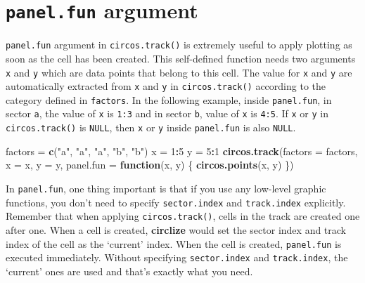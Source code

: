 \documentclass[]{book}
\newenvironment{Shaded}{\begin{snugshade}}{\end{snugshade}}
\newcommand{\KeywordTok}[1]{\textcolor[rgb]{0.13,0.29,0.53}{\textbf{#1}}}
\newcommand{\DataTypeTok}[1]{\textcolor[rgb]{0.13,0.29,0.53}{#1}}
\newcommand{\DecValTok}[1]{\textcolor[rgb]{0.00,0.00,0.81}{#1}}
\newcommand{\StringTok}[1]{\textcolor[rgb]{0.31,0.60,0.02}{#1}}
\newcommand{\ControlFlowTok}[1]{\textcolor[rgb]{0.13,0.29,0.53}{\textbf{#1}}}
\newcommand{\OperatorTok}[1]{\textcolor[rgb]{0.81,0.36,0.00}{\textbf{#1}}}
\newcommand{\NormalTok}[1]{#1}
\begin{document}
\section{\texorpdfstring{\texttt{panel.fun}
argument}{panel.fun argument}}\label{panel-fun}

\texttt{panel.fun} argument in \texttt{circos.track()} is extremely
useful to apply plotting as soon as the cell has been created. This
self-defined function needs two arguments \texttt{x} and \texttt{y}
which are data points that belong to this cell. The value for \texttt{x}
and \texttt{y} are automatically extracted from \texttt{x} and
\texttt{y} in \texttt{circos.track()} according to the category defined
in \texttt{factors}. In the following example, inside
\texttt{panel.fun}, in sector \texttt{a}, the value of \texttt{x} is
\texttt{1:3} and in sector \texttt{b}, value of \texttt{x} is
\texttt{4:5}. If \texttt{x} or \texttt{y} in \texttt{circos.track()} is
\texttt{NULL}, then \texttt{x} or \texttt{y} inside \texttt{panel.fun}
is also \texttt{NULL}.

\begin{Shaded}
\begin{Highlighting}[]
\NormalTok{factors =}\StringTok{ }\KeywordTok{c}\NormalTok{(}\StringTok{"a"}\NormalTok{, }\StringTok{"a"}\NormalTok{, }\StringTok{"a"}\NormalTok{, }\StringTok{"b"}\NormalTok{, }\StringTok{"b"}\NormalTok{)}
\NormalTok{x =}\StringTok{ }\DecValTok{1}\OperatorTok{:}\DecValTok{5}
\NormalTok{y =}\StringTok{ }\DecValTok{5}\OperatorTok{:}\DecValTok{1}
\KeywordTok{circos.track}\NormalTok{(}\DataTypeTok{factors =}\NormalTok{ factors, }\DataTypeTok{x =}\NormalTok{ x, }\DataTypeTok{y =}\NormalTok{ y,}
    \DataTypeTok{panel.fun =} \ControlFlowTok{function}\NormalTok{(x, y) \{}
        \KeywordTok{circos.points}\NormalTok{(x, y)}
\NormalTok{\})}
\end{Highlighting}
\end{Shaded}

In \texttt{panel.fun}, one thing important is that if you use any
low-level graphic functions, you don't need to specify
\texttt{sector.index} and \texttt{track.index} explicitly. Remember that
when applying \texttt{circos.track()}, cells in the track are created
one after one. When a cell is created, \textbf{circlize} would set the
sector index and track index of the cell as the `current' index. When
the cell is created, \texttt{panel.fun} is executed immediately. Without
specifying \texttt{sector.index} and \texttt{track.index}, the `current'
ones are used and that's exactly what you need.
\end{document}
